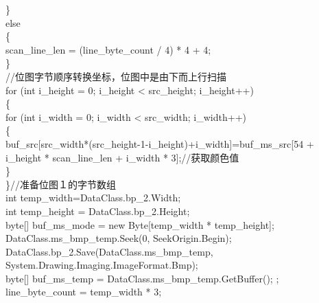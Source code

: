 ﻿\documentclass[12pt,a4paper,oneside]{book}
\begin{document}
\begin{enumerate}
\hspace*{4em}\}\\
\hspace*{4em}else\\
\hspace*{4em}\{\\
\hspace*{6em}scan\_line\_len = (line\_byte\_count / 4) * 4 + 4;\\
\hspace*{4em}\}\\
\hspace*{4em}//位图字节顺序转换坐标，位图中是由下而上行扫描\\
\hspace*{4em}for (int i\_height = 0; i\_height < src\_height; i\_height++)\\
\hspace*{4em}\{\\
\hspace*{6em}for (int i\_width = 0; i\_width < src\_width; i\_width++)    \\
\hspace*{6em}\{\\
\hspace*{6em}buf\_src[src\_width*(src\_height-1-i\_height)+i\_width]=buf\_ms\_src[54 + i\_height * scan\_line\_len + i\_width * 3];//获取颜色值 \\
\hspace*{6em}\}\\
\hspace*{4em}\}//准备位图１的字节数组 \\
\hspace*{4em}int temp\_width=DataClass.bp\_2.Width;\\
\hspace*{4em}int temp\_height = DataClass.bp\_2.Height;\\
\hspace*{4em}byte[] buf\_ms\_mode = new Byte[temp\_width * temp\_height];\\
\hspace*{4em}DataClass.ms\_bmp\_temp.Seek(0, SeekOrigin.Begin);\\
\hspace*{4em}DataClass.bp\_2.Save(DataClass.ms\_bmp\_temp, System.Drawing.Imaging.ImageFormat.Bmp);\\
\hspace*{4em}byte[] buf\_ms\_temp = DataClass.ms\_bmp\_temp.GetBuffer(); ;\\
\hspace*{4em}line\_byte\_count = temp\_width * 3;\\

\end{enumerate}
\end{document}
